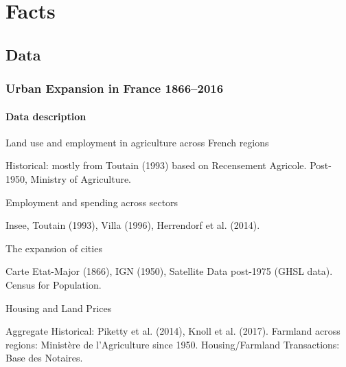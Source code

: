 \documentclass[aspectratio=169]{beamer}
\begin{document}
\begin{v75mins}

\end{v75mins}


\section{Facts}
\subsection{Data}

\begin{v75mins}
\begin{frame}
\frametitle{Urban Expansion in France 1866--2016}
\framesubtitle{Data description}
\bi
\item Land use and employment in agriculture across French regions
\bi\item Historical: mostly from Toutain (1993) based on Recensement Agricole. Post-1950, Ministry of Agriculture. \ei
\bigskip
\item Employment and spending across sectors
\bi\item Insee, Toutain (1993), Villa (1996), Herrendorf et al. (2014).\ei
\bigskip
\item The expansion of cities
\bi\item Carte Etat-Major (1866), IGN (1950), Satellite Data post-1975 (GHSL data). Census for Population.
\ei
\bigskip
\item Housing and Land Prices
\bi\item Aggregate Historical: Piketty et al. (2014), Knoll et al. (2017). Farmland across regions: Ministère de l'Agriculture since 1950. Housing/Farmland Transactions: Base des Notaires.
\ei
\ei
\end{frame}
\end{v75mins}
\end{document}
